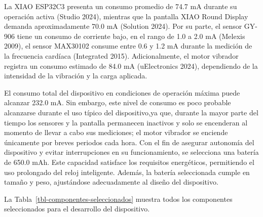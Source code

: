 \documentclass[
  12pt,
  letterpaper,
  DIV=11,
  numbers=noendperiod]{scrreport}
\begin{document}
La XIAO ESP32C3 presenta un consumo promedio de 74.7 mA durante su
operación activa (Studio 2024), mientras que la pantalla XIAO Round
Display demanda aproximadamente 70.0 mA (Solution 2024). Por su parte,
el sensor GY-906 tiene un consumo de corriente bajo, en el rango de 1.0
a 2.0 mA (Melexis 2009), el sensor MAX30102 consume entre 0.6 y 1.2 mA
durante la medición de la frecuencia cardíaca (Integrated 2015).
Adicionalmente, el motor vibrador registra un consumo estimado de 84.0
mA (uElectronics 2024), dependiendo de la intensidad de la vibración y
la carga aplicada.

El consumo total del dispositivo en condiciones de operación máxima
puede alcanzar 232.0 mA. Sin embargo, este nivel de consumo es poco
probable alcanzarse durante el uso típico del dispositivo,ya que,
durante la mayor parte del tiempo los sensores y la pantalla permanecen
inactivos y solo se encenderan al momento de llevar a cabo sus
mediciones; el motor vibrador se enciende únicamente por breves periodos
cada hora. Con el fin de asegurar autonomía del dispositivo y evitar
interrupciones en su funcionamiento, se selecciona una batería de 650.0
mAh. Este capacidad satisface los requisitos energéticos, permitiendo el
uso prolongado del reloj inteligente. Además, la batería seleccionada
cumple en tamaño y peso, ajustándose adecuadamente al diseño del
dispositivo.

La Tabla~\ref{tbl-componentes-seleccionados} muestra todos los
componentes seleccionados para el desarrollo del dispositivo.
\end{document}
